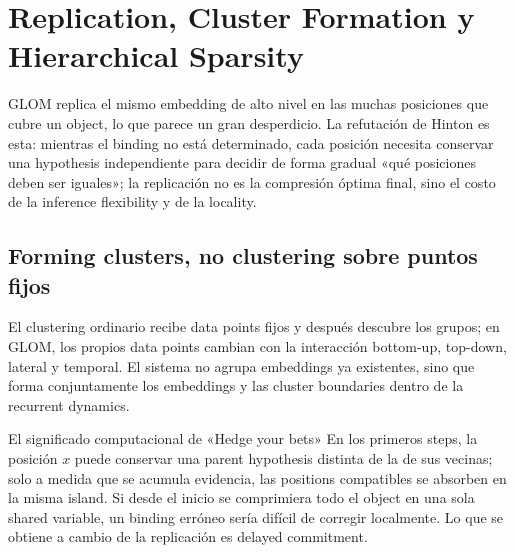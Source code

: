 \section{Replication, Cluster Formation y Hierarchical Sparsity}

GLOM replica el mismo embedding de alto nivel en las muchas posiciones que cubre un object, lo que parece un gran desperdicio. La refutación de Hinton es esta: mientras el binding no está determinado, cada posición necesita conservar una hypothesis independiente para decidir de forma gradual «qué posiciones deben ser iguales»; la replicación no es la compresión óptima final, sino el costo de la inference flexibility y de la locality.



\subsection{Forming clusters, no clustering sobre puntos fijos}

El clustering ordinario recibe data points fijos y después descubre los grupos; en GLOM, los propios data points cambian con la interacción bottom-up, top-down, lateral y temporal. El sistema no agrupa embeddings ya existentes, sino que forma conjuntamente los embeddings y las cluster boundaries dentro de la recurrent dynamics.

\begin{importantbox}{El significado computacional de «Hedge your bets»}
En los primeros steps, la posición $x$ puede conservar una parent hypothesis distinta de la de sus vecinas; solo a medida que se acumula evidencia, las positions compatibles se absorben en la misma island. Si desde el inicio se comprimiera todo el object en una sola shared variable, un binding erróneo sería difícil de corregir localmente. Lo que se obtiene a cambio de la replicación es delayed commitment.
\end{importantbox}

